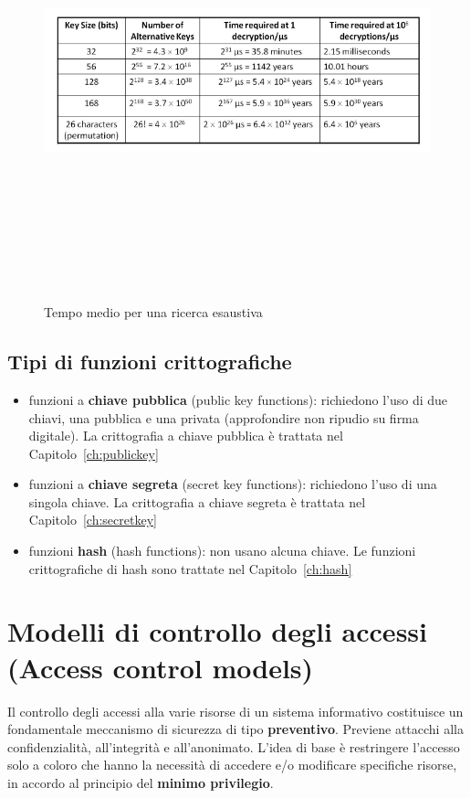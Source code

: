 \begin{figure}[htbp]
	\centering%
	\subfigure%
	{\includegraphics[height=12cm, width=13cm, keepaspectratio]{Immagini/introduzione/tab_tempi.png}}
	\caption{Tempo medio per una ricerca esaustiva \label{fig:tab_tempi}} 	
\end{figure}

\subsection{Tipi di funzioni crittografiche}
\begin{itemize} 
  \item funzioni a \textbf{chiave pubblica} (public key functions): richiedono l'uso di due chiavi, una pubblica e una privata (approfondire non ripudio su firma digitale). La crittografia a chiave pubblica è trattata nel Capitolo~\ref{ch:publickey}
  \item funzioni a \textbf{chiave segreta} (secret key functions): richiedono l'uso di una singola chiave. La crittografia a chiave segreta è trattata nel Capitolo~\ref{ch:secretkey}
  \item funzioni \textbf{hash} (hash functions): non usano alcuna chiave. Le funzioni crittografiche di hash sono trattate nel Capitolo~\ref{ch:hash}
\end{itemize}

\section{Modelli di controllo degli accessi (Access control models)}
Il controllo degli accessi alla varie risorse di un sistema informativo costituisce un fondamentale meccanismo di sicurezza di tipo \textbf{preventivo}. Previene attacchi alla confidenzialità, all'integrità e all'anonimato. L'idea di base è restringere l'accesso solo a coloro che hanno la necessità di accedere e/o modificare specifiche risorse, in accordo al principio del \textbf{minimo privilegio}.

